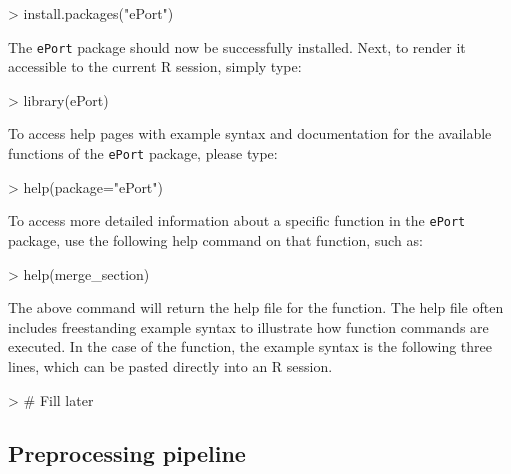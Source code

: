 \documentclass{article}
\numberwithin{equation}{section} %
\newcommand{\pkg}[1]{{\texttt{#1}}}
\newcommand{\R}{{\normalfont\textsf{R }}{}}
\begin{document}
\begin{Schunk}
\begin{Sinput}
> install.packages("ePort")
\end{Sinput}
\end{Schunk}

\noindent
The \pkg{ePort} package should now be successfully installed. Next, to render it accessible to the current \R session, simply type:

\begin{Schunk}
\begin{Sinput}
> library(ePort)
\end{Sinput}
\end{Schunk}

To access help pages with example syntax and documentation for the available functions of the \pkg{ePort} package, please type:

\begin{Schunk}
\begin{Sinput}
> help(package="ePort")
\end{Sinput}
\end{Schunk}

To access more detailed information about a specific function in the \pkg{ePort} package, use the following help command on that function, such as:

\begin{Schunk}
\begin{Sinput}
> help(merge_section)
\end{Sinput}
\end{Schunk}

The above command will return the help file for the function. The help file often includes freestanding example syntax to illustrate how function commands are executed. In the case of the function, the example syntax is the following three lines, which can be pasted directly into an \R session.

\begin{Schunk}
\begin{Sinput}
> # Fill later
\end{Sinput}
\end{Schunk}

\subsection{Preprocessing pipeline}
\end{document}
